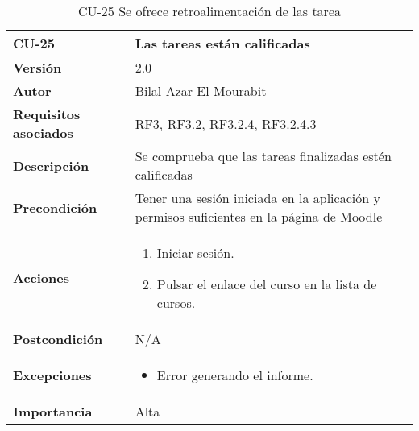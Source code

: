 \begin{table}[H]
	\centering
	\begin{tabularx}{\linewidth}{ p{} p{} }
		\toprule
		\textbf{CU-25}    & \textbf{Las tareas están calificadas}\\
		\toprule
		\textbf{Versión}              & 2.0    \\
		\textbf{Autor}                & Bilal Azar El Mourabit \\
		\textbf{Requisitos asociados} & RF3, RF3.2, RF3.2.4, RF3.2.4.3 \\
		\textbf{Descripción}          & Se comprueba que las tareas finalizadas estén calificadas\\
    		\textbf{Precondición}         & Tener una sesión iniciada en la aplicación y permisos suficientes en la página de Moodle\\
		\textbf{Acciones}             & 
		\begin{enumerate}
			\def\labelenumi{\arabic{enumi}.}
			\tightlist
			\item Iniciar sesión.
            \item Pulsar el enlace del curso en la lista de cursos. 
		\end{enumerate}\\
		\textbf{Postcondición}        & N/A \\
		\textbf{Excepciones}          & \begin{itemize}
		    \item Error generando el informe.
		\end{itemize} \\
		\textbf{Importancia}          & Alta \\
		\bottomrule
	\end{tabularx}
	\caption{CU-25 Se ofrece retroalimentación de las tarea}
\end{table}

